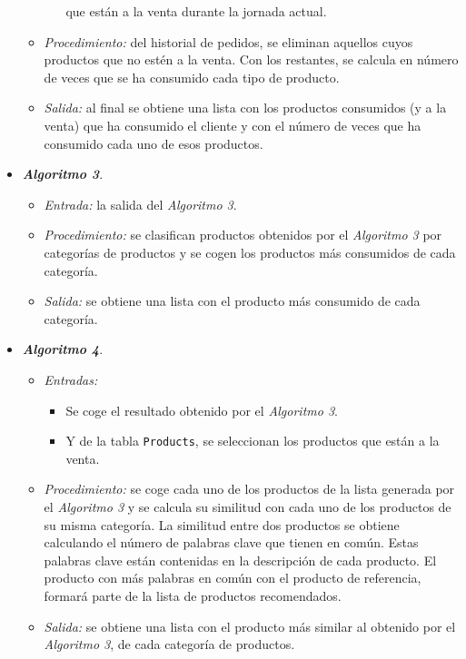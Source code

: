 \begin{itemize}
\begin{itemize}
\begin{itemize}
    que están a la venta durante la jornada actual.
    \end{itemize}
  \item \emph{Procedimiento:} del historial de pedidos, se eliminan aquellos
  cuyos productos que no estén a la venta. Con los restantes, se calcula en
  número de veces que se ha consumido cada tipo de producto.
  \item \emph{Salida:} al final se obtiene una lista con los productos
  consumidos (y a la venta) que ha consumido el cliente y con el número de
  veces que ha consumido cada uno de esos productos.
  \end{itemize}
\item \textbf{\emph{Algoritmo 3}}.
  \begin{itemize}
  \item \emph{Entrada:} la salida del \emph{Algoritmo 3}.
  \item \emph{Procedimiento:} se clasifican productos obtenidos por
  el \emph{Algoritmo 3} por categorías de productos y se cogen los productos
  más consumidos de cada categoría.
  \item \emph{Salida:} se obtiene una lista con el producto más consumido de
  cada categoría.
  \end{itemize}
\item \textbf{\emph{Algoritmo 4}}.
  \begin{itemize}
  \item \emph{Entradas:}
    \begin{itemize}
    \item Se coge el resultado obtenido por el \emph{Algoritmo 3}.
    \item Y de la tabla \texttt{Products}, se seleccionan los productos que 
    están a la venta.
    \end{itemize}
  \item \emph{Procedimiento:} se coge cada uno de los productos de la lista
  generada por el \emph{Algoritmo 3} y se calcula su similitud con cada uno
  de los productos de su misma categoría. La similitud entre dos productos se 
  obtiene calculando el número de palabras clave que tienen en común. Estas 
  palabras clave están contenidas en la descripción de cada producto. El 
  producto con más palabras en común con el producto de referencia, formará 
  parte de la lista de productos recomendados.
  \item \emph{Salida:} se obtiene una lista con el producto más similar al
  obtenido por el \emph{Algoritmo 3}, de cada categoría de productos.
  \end{itemize}

\end{itemize}
